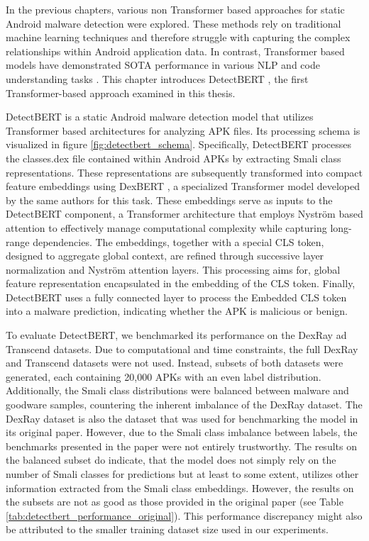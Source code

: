 In the previous chapters, various non Transformer based approaches for 
static Android malware detection were explored. 
These methods rely on traditional machine learning techniques and therefore  
struggle with capturing the complex relationships within Android application data. 
In contrast, Transformer based models have demonstrated SOTA 
performance in various NLP and code understanding tasks \cite{transformer_sota}. 
This chapter introduces DetectBERT \cite{detectbert}, the first Transformer-based approach examined 
in this thesis.

DetectBERT is a static Android malware detection model that utilizes Transformer based architectures for analyzing APK files.
Its processing schema is visualized in figure \ref{fig:detectbert_schema}.
Specifically, DetectBERT processes the classes.dex file contained within Android APKs by extracting Smali class representations. 
These representations are subsequently transformed into compact feature embeddings using DexBERT \cite{dexbert}, 
a specialized Transformer model developed by the same authors for this task.
These embeddings serve as inputs to the DetectBERT component, 
a Transformer architecture that employs Nyström based attention \cite{nystromformer} 
to effectively manage computational complexity while capturing long-range dependencies. 
The embeddings, together with a special CLS token, designed to aggregate global context, 
are refined through successive layer normalization and Nyström attention layers. 
This processing aims for, global feature representation encapsulated in the embedding of the CLS token.
Finally, DetectBERT uses a fully connected  layer to process the Embedded CLS token into a  malware prediction, 
indicating whether the APK is malicious or benign.

To evaluate DetectBERT, we benchmarked its performance on the DexRay ad Transcend datasets. 
Due to computational and time constraints, the full DexRay and Transcend datasets were not used. 
Instead, subsets of both datasets were generated, each containing 20,000 APKs with an even label distribution. 
Additionally, the Smali class distributions were balanced between malware and 
goodware samples, countering the inherent imbalance of the DexRay dataset. 
The DexRay dataset is also the dataset that was used for benchmarking the model 
in its original paper. However, due to the Smali class imbalance between labels, 
the benchmarks presented in the paper were not entirely trustworthy. 
The results on the balanced subset do indicate, that the model does not simply rely 
on the number of Smali classes for predictions but at least to some extent, 
utilizes other information extracted from the Smali class embeddings. 
However, the results on the subsets are not as good as those provided in the 
original paper (see Table \ref{tab:detectbert_performance_original}). 
This performance discrepancy might also be attributed 
to the smaller training dataset size used in our experiments.

